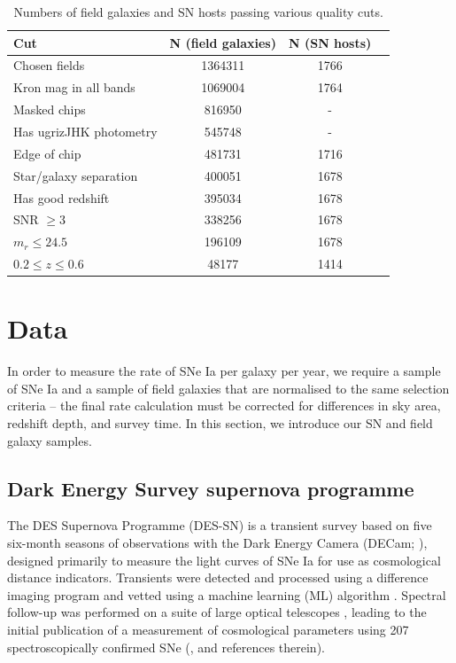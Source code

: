 \documentclass[fleqn,usenatbib]{mnras}
\begin{document}
\begin{table}
	\centering
	\caption{Numbers of field galaxies and SN hosts passing various quality cuts.}
	\label{tab:cuts}
	\begin{tabular}{lccr} %
		\hline
		Cut & N (field galaxies)  & N (SN hosts)\\
		\hline
		Chosen fields & 1364311  & 1766\\
	    Kron mag in all bands & 1069004  & 1764 \\
	    Masked chips & 816950  & - \\
	    Has ugrizJHK photometry & 545748  & -\\
	    Edge of chip & 481731 & 1716 \\
	    Star/galaxy separation & 400051 &  1678\\
	    Has good redshift & 395034 & 1678 \\
	    SNR $\geq 3$& 338256  & 1678 \\
	    $m_r \leq 24.5$ & 196109 &  1678 \\
	    $0.2 \leq z \leq 0.6$ & 48177 & 1414\\ 
	    
		\hline
	\end{tabular}
\end{table}

\section{Data}

In order to measure the rate of SNe Ia per galaxy per year, we require a sample of SNe Ia and a sample of field galaxies that are normalised to the same selection criteria -- the final rate calculation must be corrected for differences in sky area, redshift depth, and survey time. In this section, we introduce our SN and field galaxy samples.


\label{sec:data}
\subsection{Dark Energy Survey supernova programme \label{subsec:des}}
The DES Supernova Programme (DES-SN) is a transient survey based on five six-month seasons of observations with the Dark Energy Camera (DECam; \citealt{Flaugher2015}), designed primarily to measure the light curves of SNe Ia for use as cosmological distance indicators. Transients were detected and processed using a difference imaging program \citep{Kessler2015} and vetted using a machine learning (ML) algorithm \citep{Goldstein2015}. Spectral follow-up was performed on a suite of large optical telescopes \citet{Smith2020a}, leading to the initial publication of a measurement of cosmological parameters using 207 spectroscopically confirmed SNe (\citealt{DESCollaboration2018a}, and references therein). 
\end{document}
